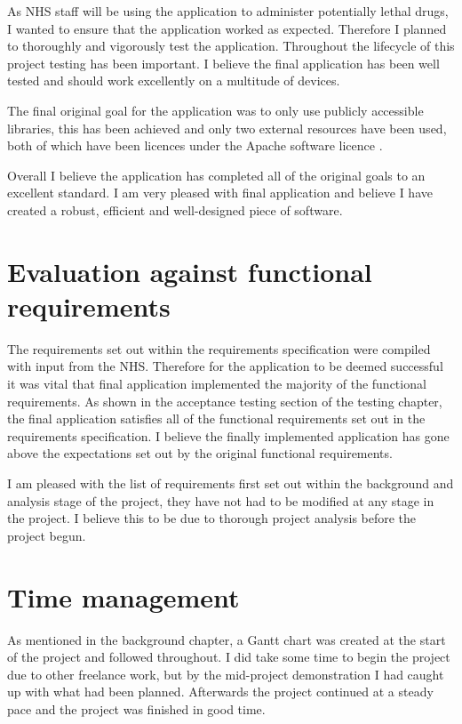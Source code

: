 As NHS staff will be using the application to administer potentially lethal drugs, I wanted to ensure that the application worked as expected. Therefore I planned to thoroughly and vigorously test the application. Throughout the lifecycle of this project testing has been important. I believe the final application has been well tested and should work excellently on a multitude of devices.

The final original goal for the application was to only use publicly accessible libraries, this has been achieved and only two external resources have been used, both of which have been licences under the Apache software licence \cite{apache_licence}.

Overall I believe the application has completed all of the original goals to an excellent standard. I am very pleased with final application and believe I have created a robust, efficient and well-designed piece of software. 


\section{Evaluation against functional requirements}

The requirements set out within the requirements specification were compiled with input from the NHS. Therefore for the application to be deemed successful it was vital that final application implemented the majority of the functional requirements. As shown in the acceptance testing section of the testing chapter, the final application satisfies all of the functional requirements set out in the requirements specification. I believe the finally implemented application has gone above the expectations set out by the original functional requirements.

I am pleased with the list of requirements first set out within the background and analysis stage of the project, they have not had to be modified at any stage in the project. I believe this to be due to thorough project analysis before the project begun.


\section{Time management}

As mentioned in the background chapter, a Gantt chart was created at the start of the project and followed throughout. I did take some time to begin the project due to other freelance work, but by the mid-project demonstration I had caught up with what had been planned. Afterwards the project continued at a steady pace and the project was finished in good time.

